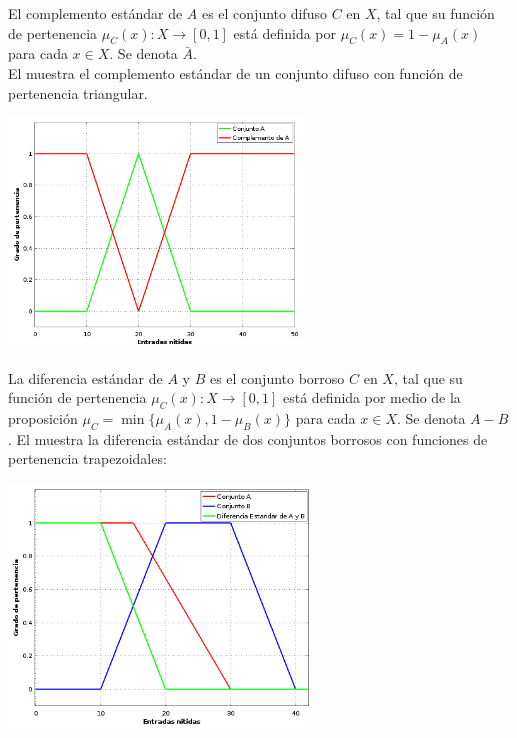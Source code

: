 El complemento estándar de $A$ es el conjunto difuso $C$ en $X$, tal que su función de pertenencia $\mu_{C}(x):X \rightarrow [0, 1]$ está definida por $\mu_{C}(x)=1 -\mu_{A}(x)$ para cada $x \in X$. Se denota $\bar{A}$.\\
El  muestra el complemento estándar de un conjunto difuso con función de pertenencia triangular.
\begin{grafico}[titulo = Complemento estandar en conjuntos difusos, etiqueta = graficoComplemento]
\includegraphics[width=8cm]{graficas/complemento.png}
\end{grafico}
La diferencia estándar de $A$ y $B$ es el conjunto borroso $C$ en $X$, tal que su función de pertenencia $\mu_{C}(x):X \rightarrow [0, 1]$ está definida por medio de la proposición $\mu_{C}= \min \{\mu_{A}(x), 1 - \mu_{B}(x) \}$  para cada $x \in X$. Se denota $A-B$.
El  muestra la diferencia estándar de dos conjuntos borrosos con funciones de pertenencia trapezoidales:
\begin{grafico}[titulo = Diferencia estandar en conjuntos difusos, etiqueta = graficoDiferencia]
\includegraphics[width=8cm]{graficas/diferencia.png}
\end{grafico}
\\
